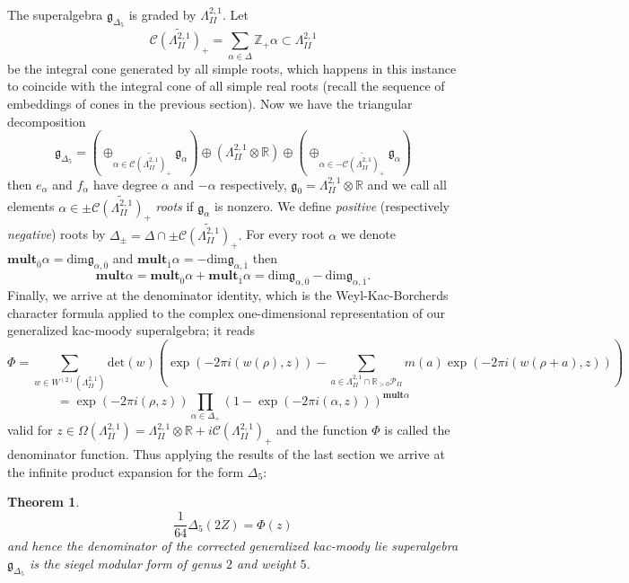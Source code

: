 \documentclass[9pt]{amsart} \usepackage[utf8]{inputenc}
\newtheorem{theorem}{Theorem}
\newcommand{\Z}{\mathbb{Z}} \newcommand{\C}{\mathbb{C}}
\newcommand{\R}{\mathbb{R}} \newcommand{\La}{\Lambda}
\newcommand{\Cone}{\mathcal{C}}
\newcommand{\Poly}{\mathcal{P}}
\newcommand{\autcor}{\mathfrak{g}_{\Delta_5}}
\begin{document}
The superalgebra $\autcor$ is graded by
$\La^{2,1}_{II}$. Let $$\widetilde{\Cone(\La^{2,1}_{II})_+} =
\sum_{\alpha \in \Delta} \Z_+\alpha \subset \La^{2,1}_{II}$$ be the
integral cone generated by all simple roots, which happens in this
instance to coincide with the integral cone of all simple real roots
(recall the sequence of embeddings of cones in the previous section).
Now we have the triangular decomposition $$\autcor = (\oplus_{\alpha \in \widetilde{\Cone(\La^{2,1}_{II})_+}} \mathfrak{g}_{\alpha}) \oplus
(\La^{2,1}_{II} \otimes \R) \oplus (\oplus_{\alpha \in
-\widetilde{\Cone(\La^{2,1}_{II})_+}} \mathfrak{g}_{\alpha})$$
 then $e_{\alpha}$ and $f_{\alpha}$ have degree
$\alpha$ and $-\alpha$ respectively, $\mathfrak{g}_0 = \La^{2,1}_{II}
\otimes \R$ and we call all elements $\alpha \in
\pm\widetilde{\Cone(\La^{2,1}_{II})_+}$ \textit{roots} if
$\mathfrak{g}_{\alpha}$ is nonzero. We define \textit{positive}
(respectively \textit{negative}) roots by $\Delta_{\pm} = \Delta \cap
\pm\widetilde{\Cone(\La^{2,1}_{II})_+}.$ For every root $\alpha$ we
denote $\textbf{mult}_{\overline{0}}\alpha =
\textrm{dim}\mathfrak{g}_{\alpha,\overline{0}}$ and
$\textbf{mult}_{\overline{1}}\alpha =
-\textrm{dim}\mathfrak{g}_{\alpha,\overline{1}}$ then
$$\textbf{mult}\alpha = \textbf{mult}_{\overline{0}}\alpha +
\textbf{mult}_{\overline{1}}\alpha = \textrm{dim}
\mathfrak{g}_{\alpha,\overline{0}} -
\textrm{dim}\mathfrak{g}_{\alpha,\overline{1}}.$$
Finally, we arrive at the denominator identity, which is the
Weyl-Kac-Borcherds character formula applied to the complex
one-dimensional representation of our generalized kac-moody
superalgebra; it reads $$\Phi = \sum_{w \in W^{(2)}(\La^{2,1}_{II})} \text{det}(w) (\exp(-2\pi i(w(\rho), z)) - \sum_{a\in \La^{2,1}_{II} \cap \R_{>0} \Poly_{II}} m(a) \exp(-2\pi i(w(\rho + a), z)) ) $$ $$= \exp(-2\pi i(\rho,z)) \displaystyle\prod_{\alpha \in \Delta_+} (1 - \exp(-2\pi i
(\alpha,z)))^{\textbf{mult}\alpha}$$ valid for $z \in
\Omega(\La^{2,1}_{II}) = \La^{2,1}_{II} \otimes \R + i
\Cone(\La^{2,1}_{II})_+$ and the function $\Phi$ is called the
denominator function.  Thus applying the results of the last section we
arrive at the infinite product expansion for the form $\Delta_5$:

\begin{theorem}
  $$\frac{1}{64}\Delta_5(2Z) = \Phi(z)$$
  and hence the denominator of the \textit{corrected} generalized
  kac-moody lie superalgebra $\autcor$ is the
  siegel modular form of genus $2$ and weight $5$.
\end{theorem}
\end{document}
